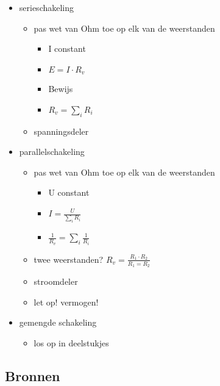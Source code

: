 \documentclass[11pt]{article}
\let\originalitem\item
\renewcommand{\item}{\originalitem[]}
\newcommand{\Newpage}{\end{preview}\begin{preview}}
\begin{document}
\begin{preview}
\begin{itemize}
\item serieschakeling
	\begin{itemize}
		\item pas wet van Ohm toe op elk van de weerstanden
		\begin{itemize}
			\item I constant
			\item $E=I \cdot R_v$
			\item Bewijs %
			\item $R_v = \sum_i R_i$
		\end{itemize}
		\item spanningsdeler
	\end{itemize}
\item parallelschakeling
	\begin{itemize}
		\item pas wet van Ohm toe op elk van de weerstanden
		\begin{itemize}
			\item U constant
			\item $I = \frac{U}{\sum_i R_i}$
			\item $\frac{1}{R_v} = \sum_i \frac{1}{R_i}$
		\end{itemize}
		\item twee weerstanden? $R_v = \frac{R_1 \cdot R_2}{R_1 = R_2}$
		\item stroomdeler
		\item let op! vermogen! %
	\end{itemize}
\item gemengde schakeling
	\begin{itemize}
		\item los op in deelstukjes
	\end{itemize}
\end{itemize}

\Newpage
\section{Bronnen}


\end{preview}
\end{document}

